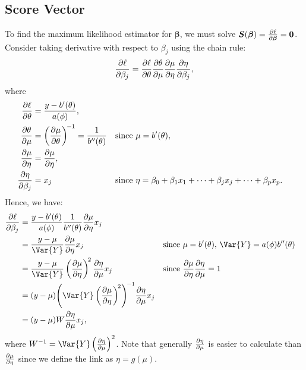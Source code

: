 \documentclass[oneside]{book}\usepackage[]{graphicx}\usepackage[svgnames]{xcolor}
\providecommand{\Vector}[1]{\bm{#1}}%
\begin{document}
\subsection*{Score Vector}
To find the maximum likelihood estimator for $ \Vector{\beta} $, we must solve $ \Vector{S}(\Vector{\beta})=\pdv{\ell}{\Vector{\beta}}=\Vector{0} $.
Consider taking derivative with respect to $ \beta_j $ using the chain rule:
\[ \pdv{\ell}{\beta_j}=\pdv{\ell}{\theta}\pdv{\theta}{\mu}\pdv{\mu}{\eta}\pdv{\eta}{\beta_j}, \]
where
\begin{align*}
    \pdv{\ell}{\theta}  & =\frac{y-b^{\prime}(\theta)}{a(\phi)},                                                                                                          \\
    \pdv{\theta}{\mu}   & =\pdv{\mu}{\theta}^{\!-1}=\frac{1}{b^{\prime\prime}(\theta)} &  & \text{since $ \mu=b^\prime(\theta) $},                                        \\
    \pdv{\mu}{\eta}     & =\pdv{\mu}{\eta},                                                                                                                               \\
    \pdv{\eta}{\beta_j} & =x_j                                                         &  & \text{since $ \eta=\beta_0+\beta_1x_1+\cdots+\beta_jx_j+\cdots+\beta_px_p $}.
\end{align*}
Hence, we have:
\begin{align*}
    \pdv{\ell}{\beta_j}
     & =\frac{y-b^{\prime}(\theta)}{a(\phi)}\frac{1}{b^{\prime\prime}(\theta)}\pdv{\mu}{\eta}x_j                                                                                           \\
     & =\frac{y-\mu}{\Var{Y}}\pdv{\mu}{\eta}x_j                                                  &  & \text{since $ \mu=b^{\prime}(\theta) $, $ \Var{Y}=a(\phi)b^{\prime\prime}(\theta) $} \\
     & =\frac{y-\mu}{\Var{Y}}\pdv{\mu}{\eta}^{\!2}\pdv{\eta}{\mu}x_j                             &  & \text{since $ \pdv{\mu}{\eta}\pdv{\eta}{\mu}=1 $}                                    \\
     & =(y-\mu)\Biggl(\Var{Y}\pdv{\mu}{\eta}^{\!2}\Biggr)^{\!-1}\pdv{\eta}{\mu}x_j                                                                                                         \\
     & =(y-\mu)W\pdv{\eta}{\mu}x_j,
\end{align*}
where $ W^{-1}=\Var{Y}\pdv{\eta}{\mu}^2 $. Note that generally $ \pdv{\eta}{\mu} $ is easier to calculate
than $ \pdv{\mu}{\eta} $ since we define the link as $ \eta=g(\mu) $.
\end{document}
